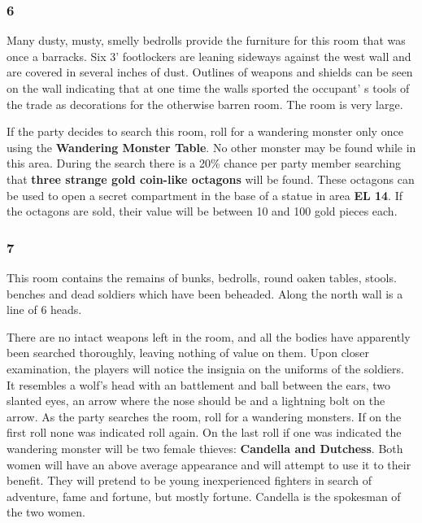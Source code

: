 \documentclass[palace_of_the_silver_princess]{subfiles}
\begin{document}
\subsubsection{6}
\begin{quotebox}
    Many dusty, musty, smelly bedrolls provide the furniture for this
    room that was once a barracks. Six 3’ footlockers are leaning
    sideways against the west wall and are covered in several inches of
    dust. Outlines of weapons and shields can be seen on the wall
    indicating that at one time the walls sported the occupant’ s tools
    of the trade as decorations for the otherwise barren room. The
    room is very large.
\end{quotebox}

If the party decides to search this room, roll for a wandering monster
only once using the \textbf{Wandering Monster Table}. No other monster
may be found while in this area. During the search there is a 20\%
chance per party member searching that \textbf{three strange gold
coin-like octagons} will be found. These octagons can be used to open a
secret compartment in the base of a statue in area \textbf{EL 14}. If
the octagons are sold, their value will be between 10 and 100 gold
pieces each.

\subsubsection{7}
\begin{quotebox}
    This room contains the remains of bunks, bedrolls, round oaken
    tables, stools. benches and dead soldiers which have been beheaded.
    Along the north wall is a line of 6 heads.
\end{quotebox}

There are no intact weapons left in the room, and all the bodies have
apparently been searched thoroughly, leaving nothing of value on them.
Upon closer examination, the players will notice the insignia on the
uniforms of the soldiers. It resembles a wolf's head with an battlement
and ball between the ears, two slanted eyes, an arrow where the nose
should be and a lightning bolt on the arrow. As the party searches the
room, roll for a wandering monsters. If on the first roll none was
indicated roll again. On the last roll if one was indicated the
wandering monster will be two female thieves: \textbf{Candella and
Dutchess}.  Both women will have an above average appearance and will
attempt to use it to their benefit. They will pretend to be young
inexperienced fighters in search of adventure, fame and fortune, but
mostly fortune.  Candella is the spokesman of the two women.
\end{document}
